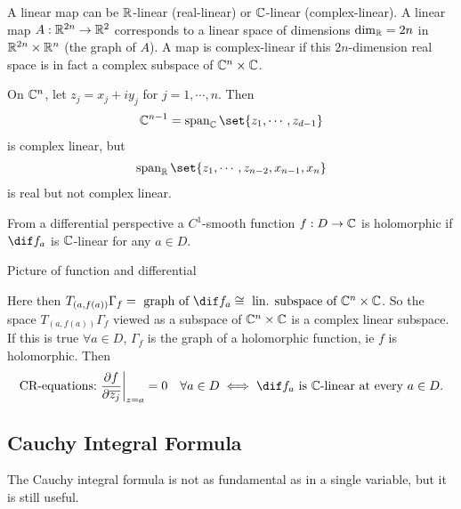 \begin{remark}
    A linear map can be $\mathbb{R}$-linear (real-linear) or $\mathbb{C}$-linear (complex-linear). A linear map $A : \mathbb{R}^{2n} \to \mathbb{R}^2$ corresponds to a linear space of dimensions $\dim_{\mathbb{R}} = 2n$ in $\mathbb{R}^{2n} \times \mathbb{R}^n$ (the graph of $A$). A map is complex-linear if this $2n$-dimension real space is in fact a complex subspace of $\mathbb{C}^n \times \mathbb{C}$.
\end{remark}

\begin{example}
    On $\mathbb{C}^n$, let $z_j = x_j + i y_j$ for $j = 1, \cdots, n$. Then
    \begin{align*}
        \C^{n-1} = \operatorname{span}_{\C} \set{ z_1 , \cdots, z_{d-1}}
    \end{align*}
    is complex linear, but
    \begin{align*}
        \operatorname{span}_{\R} \set{z_1 , \cdots , z_{n-2} , x_{n-1} , x_n}
    \end{align*}
    is real but not complex linear.
\end{example}

\begin{remark}
    From a differential perspective a $C^1$-smooth function $f : D \to \mathbb{C}$ is holomorphic if $\dif f_a$ is $\mathbb{C}$-linear for any $a \in D$.

    Picture of function and differential

    Here then $T_{(a,f(a))} \Gamma_f = \text{ graph of } \dif f_a \cong \text{ lin. subspace of } \C^n \times \C$. So the space $T_{(a,f(a))} \Gamma_f$ viewed as a subspace of $\mathbb{C}^n \times \mathbb{C}$ is a complex linear subspace. If this is true $\forall a \in D$, $\Gamma_f$ is the graph of a holomorphic function, ie $f$ is holomorphic. Then
    \begin{align*}
        \text{CR-equations:} \left. \frac{\partial f}{ \partial \overline{z_j} } \right|_{z=a} = 0 \quad \forall a \in D \iff \dif f_a \text{ is $\C$-linear at every $a \in D$}.
    \end{align*}
\end{remark}

\subsection{Cauchy Integral Formula}
The Cauchy integral formula is not as fundamental as in a single variable, but it is still useful.

